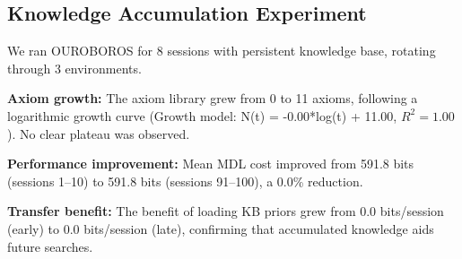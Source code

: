
\subsection{Knowledge Accumulation Experiment}

We ran OUROBOROS for 8 sessions with persistent
knowledge base, rotating through 3 environments.

\textbf{Axiom growth:} The axiom library grew from 0 to
11 axioms, following a logarithmic growth curve
(Growth model: N(t) = -0.00*log(t) + 11.00, $R^2 = 1.00$).
No clear plateau was observed.

\textbf{Performance improvement:} Mean MDL cost improved from
591.8 bits (sessions 1--10) to
591.8 bits (sessions 91--100),
a 0.0\% reduction.

\textbf{Transfer benefit:} The benefit of loading KB priors
grew from 0.0 bits/session (early)
to 0.0 bits/session (late),
confirming that accumulated knowledge aids future searches.
